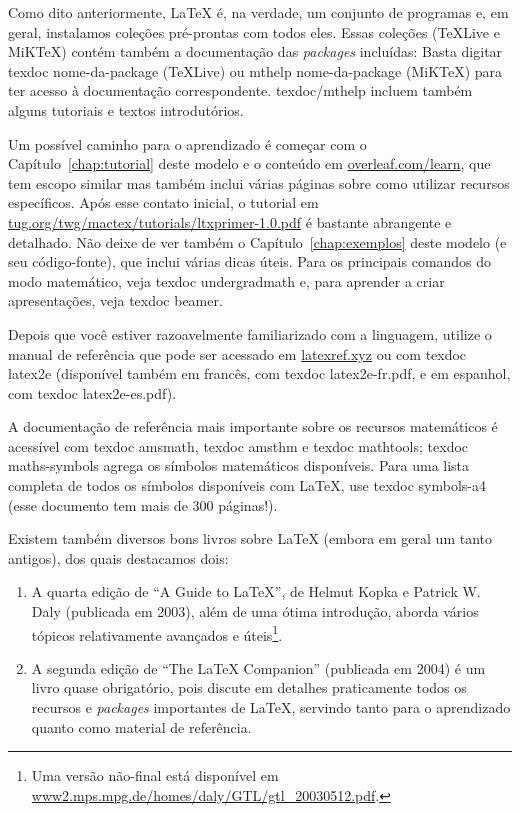 Como dito anteriormente, \LaTeX{} é, na verdade, um conjunto de programas
e, em geral, instalamos coleções pré-prontas com todos eles. Essas coleções
(\TeX{}Live e MiK\TeX{}) contém também a documentação das \textit{packages}
incluídas: Basta digitar \textsf{texdoc nome-da-package} (\TeX{}Live) ou
\textsf{mthelp nome-da-package} (MiK\TeX{}) para ter acesso à documentação
correspondente. \textsf{texdoc/mthelp} incluem também alguns tutoriais e
textos introdutórios.

Um possível caminho para o aprendizado é começar com o
Capítulo~\ref{chap:tutorial} deste modelo e o conteúdo em
\url{overleaf.com/learn}, que tem escopo similar mas também inclui várias
páginas sobre como utilizar recursos específicos. Após esse contato inicial,
o tutorial em \url{tug.org/twg/mactex/tutorials/ltxprimer-1.0.pdf} é
bastante abrangente e detalhado. Não deixe de ver também o
Capítulo~\ref{chap:exemplos} deste modelo (e seu código-fonte), que
inclui várias dicas úteis. Para os principais comandos do modo matemático,
veja \textsf{texdoc undergradmath} e, para aprender a criar apresentações,
veja \textsf{texdoc beamer}.

Depois que você estiver razoavelmente
familiarizado com a linguagem, utilize o manual de referência que pode ser
acessado em \url{latexref.xyz} ou com \textsf{texdoc latex2e} (disponível
também em francês, com \textsf{texdoc latex2e-fr.pdf}, e em espanhol, com
\textsf{texdoc latex2e-es.pdf}).

A documentação de referência mais importante sobre os recursos matemáticos
é acessível com \textsf{texdoc amsmath}, \textsf{texdoc amsthm} e
\textsf{texdoc mathtools}; \textsf{texdoc maths-symbols} agrega os símbolos
matemáticos disponíveis. Para uma lista completa de todos os símbolos
disponíveis com \LaTeX{}, use \textsf{texdoc symbols-a4} (esse documento
tem mais de 300 páginas!).

Existem também diversos bons livros sobre \LaTeX{} (embora em geral um
tanto antigos), dos quais destacamos dois:

\begin{enumerate}

  \item A quarta edição de ``A Guide to \LaTeX'', de Helmut Kopka
        e Patrick W. Daly (publicada em 2003), além de uma ótima
        introdução, aborda vários tópicos relativamente avançados
        e úteis\footnote{Uma versão não-final está disponível em
        \url{www2.mps.mpg.de/homes/daly/GTL/gtl_20030512.pdf}.}.
  \item A segunda edição de ``The \LaTeX{} Companion'' (publicada em
        2004) é um livro quase obrigatório, pois discute em detalhes
        praticamente todos os recursos e \textit{packages} importantes
        de \LaTeX{}, servindo tanto para o aprendizado quanto como
        material de referência.

\end{enumerate}

